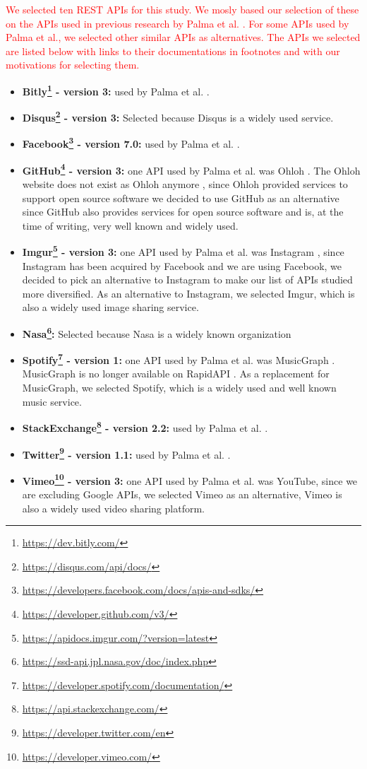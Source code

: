\textcolor{red}{
We selected ten REST APIs for this study. We mosly based our selection of these on the APIs used in previous research by Palma et al. \cite{design}\cite{linguistic}. For some APIs used by Palma et al., we selected other similar APIs as alternatives. The APIs we selected are listed below with links to their documentations in footnotes and with our motivations for selecting them. 
}

\begin{itemize}
\label{APIsusedintheresearch}
    \item \textbf{Bitly\footnote{\url{https://dev.bitly.com/}} - version 3:} used by Palma et al. \cite{linguistic}.
    \item \textbf{Disqus\footnote{\url{https://disqus.com/api/docs/}} - version 3:} Selected because Disqus  is  a  widely used service.
    \item \textbf{Facebook\footnote{\url{https://developers.facebook.com/docs/apis-and-sdks/}} - version 7.0:} used by Palma et al. \cite{linguistic}.
    \item \textbf{GitHub\footnote{\url{https://developer.github.com/v3/}} - version 3:} one API used by Palma et al. was Ohloh \cite{linguistic}. The Ohloh website does not exist as Ohloh anymore \cite{ohloh}, since Ohloh provided services to support open source software \cite{ohloh} we decided to use GitHub as an alternative since GitHub also provides services for open source software and is, at the time of writing, very well known and widely used. 
    \item \textbf{Imgur\footnote{\url{https://apidocs.imgur.com/?version=latest}} - version 3:} one API used by Palma et al. was Instagram \cite{linguistic}, since Instagram has been acquired by Facebook and we are using Facebook, we decided to pick an alternative to Instagram to make our list of APIs studied more diversified. As an alternative to Instagram, we selected Imgur, which is also a widely used image sharing service.
    \item \textbf{Nasa\footnote{\url{https://ssd-api.jpl.nasa.gov/doc/index.php}}:} Selected because Nasa is a widely known organization
    \item \textbf{Spotify\footnote{\url{https://developer.spotify.com/documentation/}} - version 1:} one API used by Palma et al. was MusicGraph \cite{linguistic}. MusicGraph is no longer available on RapidAPI \cite{musicrapid}. As a replacement for MusicGraph, we selected Spotify, which is a widely used and well known music service. 
    \item \textbf{StackExchange\footnote{\url{https://api.stackexchange.com/}} - version 2.2:} used by Palma et al. \cite{linguistic}.
    \item \textbf{Twitter\footnote{\url{https://developer.twitter.com/en}} - version 1.1:} used by Palma et al. \cite{linguistic}.
    \item \textbf{Vimeo\footnote{\url{https://developer.vimeo.com/}} - version 3:} one API used by Palma et al. \cite{linguistic} was YouTube, since we are excluding Google APIs, we selected Vimeo as an alternative, Vimeo is also a widely used video sharing platform. 
\end{itemize}

